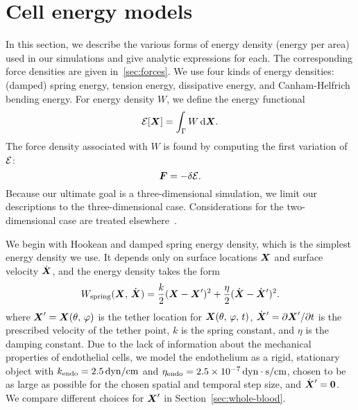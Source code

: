 \section{Cell energy models}\label{sec:energy}

In this section, we describe the various forms of energy density (energy per area) used
in our simulations and give analytic expressions for each. The corresponding force
densities are given in~\ref{sec:forces}. We use four kinds of energy densities: (damped)
spring energy, tension energy, dissipative energy, and Canham-Helfrich bending energy.
For energy density $W$, we define the energy functional
\begin{equation*}
    \energy[\X] = \int_\interface W \d\X.
\end{equation*}
The force density associated with $W$ is found by computing the first variation of
$\mathcal{E}$: 
\begin{equation}
    \boldsymbol{F} = -\delta\mathcal{E}.
\end{equation}
Because our ultimate goal is a three-dimensional simulation, we limit our descriptions to
the three-dimensional case. Considerations for the two-dimensional case are treated
elsewhere~\cite{Peskin:2002go,Erickson:2010uzba}.

We begin with Hookean and damped spring energy density, which is the simplest energy
density we use. It depends only on surface locations $\boldsymbol{X}$ and surface velocity $\dot{\boldsymbol{X}}$, and
the energy density takes the form
\begin{equation}
    W_\text{spring}(\boldsymbol{X},\,\dot{\boldsymbol{X}}) = \frac{k}2 (\boldsymbol{X} - \boldsymbol{X}')^2 + \frac{\eta}2(\dot{\boldsymbol{X}} - \dot{\boldsymbol{X}}')^2.
\end{equation}
where $\boldsymbol{X}'=\boldsymbol{X}(\theta,\,\varphi)$ is the tether location for $\boldsymbol{X}(\theta,\,\varphi,\,t)$,
$\dot{\boldsymbol{X}}' = \partial\boldsymbol{X}'/\partial t$ is the prescribed velocity of the tether point, $k$ is the
spring constant, and $\eta$ is the damping constant. Due to the lack of information about
the mechanical properties of endothelial cells, we model the endothelium as a rigid,
stationary object with $\ethm{k} = 2.5\dynpercm$ and
$\ethm\eta = 2.5\sci{-7}\dynsecpercm$, chosen to be as large as possible for the
chosen spatial and temporal step size, and $\dot{\boldsymbol{X}}' = \boldsymbol{0}$. We compare different choices
for $\boldsymbol{X}'$ in Section~\ref{sec:whole-blood}.

